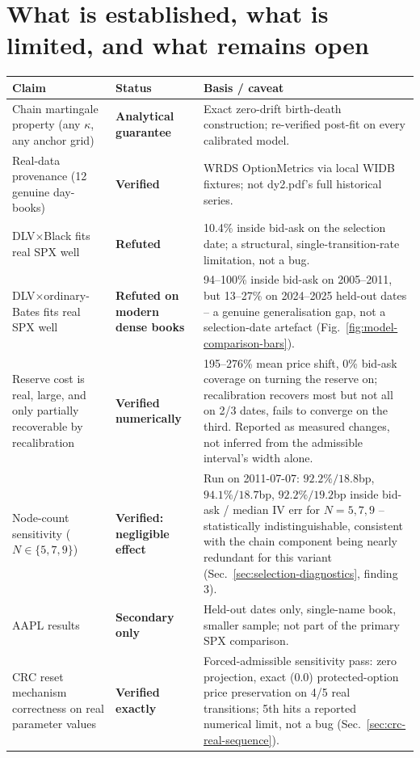 \section{What is established, what is limited, and what remains open}
\label{sec:deferred-real-data}

\begin{table}[H]
\centering
\small
\begin{tabular}{p{5.4cm}p{2.6cm}p{6.2cm}}
\toprule
Claim & Status & Basis / caveat \\
\midrule
Chain martingale property (any $\kappa$, any anchor grid) &
  \textbf{Analytical guarantee} & Exact zero-drift birth-death construction; re-verified post-fit on every calibrated model. \\
Real-data provenance (12 genuine day-books) &
  \textbf{Verified} & WRDS OptionMetrics via local WIDB fixtures; not dy2.pdf's full historical series. \\
DLV$\times$Black fits real SPX well &
  \textbf{Refuted} & 10.4\% inside bid-ask on the selection date; a structural, single-transition-rate limitation, not a bug. \\
DLV$\times$ordinary-Bates fits real SPX well &
  \textbf{Refuted on modern dense books} & 94--100\% inside bid-ask on 2005--2011, but 13--27\% on 2024--2025 held-out dates -- a genuine generalisation gap, not a selection-date artefact (Fig.~\ref{fig:model-comparison-bars}). \\
Reserve cost is real, large, and only partially recoverable by recalibration &
  \textbf{Verified numerically} & 195--276\% mean price shift, 0\% bid-ask coverage on turning the reserve on; recalibration recovers most but not all on 2/3 dates, fails to converge on the third. Reported as measured changes, not inferred from the admissible interval's width alone. \\
Node-count sensitivity ($N\in\{5,7,9\}$) &
  \textbf{Verified: negligible effect} & Run on 2011-07-07: $92.2\%/18.8$bp, $94.1\%/18.7$bp, $92.2\%/19.2$bp inside bid-ask / median IV err for $N{=}5,7,9$ -- statistically indistinguishable, consistent with the chain component being nearly redundant for this variant (Sec.~\ref{sec:selection-diagnostics}, finding 3). \\
AAPL results &
  \textbf{Secondary only} & Held-out dates only, single-name book, smaller sample; not part of the primary SPX comparison. \\
CRC reset mechanism correctness on real parameter values &
  \textbf{Verified exactly} & Forced-admissible sensitivity pass: zero projection, exact (0.0) protected-option price preservation on 4/5 real transitions; 5th hits a reported numerical limit, not a bug (Sec.~\ref{sec:crc-real-sequence}). \\

\end{tabular}
\end{table}

